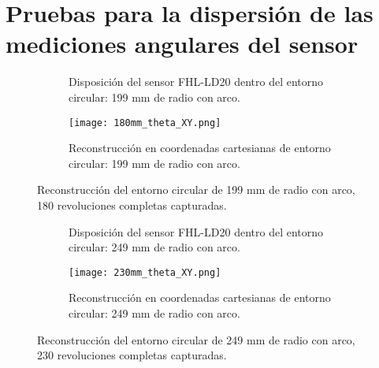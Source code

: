 \section{Pruebas para la dispersión de las mediciones angulares del sensor}
\label{dispersion_angular}
\begin{figure}[H]
	\centering
	\begin{subfigure}{0.45\textwidth}
		\centering
		\caption{Disposición del sensor FHL-LD20 dentro del entorno circular: 199 mm de radio con arco.}
		\label{fig:disposicion_lidar_theta2}
	\end{subfigure}
	\hspace{1em}
	\begin{subfigure}{0.45\textwidth}
		\centering
		\texttt{[image: 180mm\_theta\_XY.png]}
		\caption{Reconstrucción en coordenadas cartesianas de entorno circular: 199 mm de radio con arco.}
		\label{fig:199m_radius_xy_theta2}
	\end{subfigure}
	\caption{Reconstrucción del entorno circular de 199 mm de radio con arco, 180 revoluciones completas capturadas.}
	\label{fig:disposicion_lidar_var_theta2}
\end{figure}

\begin{figure}[H]
	\centering
	\begin{subfigure}{0.45\textwidth}
		\centering
		\caption{Disposición del sensor FHL-LD20 dentro del entorno circular: 249 mm de radio con arco.}
		\label{fig:disposicion_lidar_theta3}
	\end{subfigure}
	\hspace{1em}
	\begin{subfigure}{0.45\textwidth}
		\centering
		\texttt{[image: 230mm\_theta\_XY.png]}
		\caption{Reconstrucción en coordenadas cartesianas de entorno circular: 249 mm de radio con arco.}
		\label{fig:249m_radius_xy_theta3}
	\end{subfigure}
	\caption{Reconstrucción del entorno circular de 249 mm de radio con arco, 230 revoluciones completas capturadas.}
	\label{fig:disposicion_lidar_var_theta3}
\end{figure}


